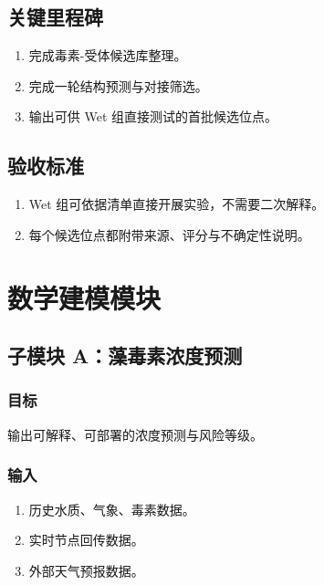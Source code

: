 \documentclass[12pt,a4paper,openany]{ctexrep}
\begin{document}
\section{关键里程碑}

\begin{enumerate}
\item 完成毒素-受体候选库整理。
\item 完成一轮结构预测与对接筛选。
\item 输出可供 Wet 组直接测试的首批候选位点。
\end{enumerate}

\section{验收标准}

\begin{enumerate}
\item Wet 组可依据清单直接开展实验，不需要二次解释。
\item 每个候选位点都附带来源、评分与不确定性说明。
\end{enumerate}

\chapter{数学建模模块}

\section{子模块 A：藻毒素浓度预测}

\subsection{目标}

输出可解释、可部署的浓度预测与风险等级。

\subsection{输入}

\begin{enumerate}
\item 历史水质、气象、毒素数据。
\item 实时节点回传数据。
\item 外部天气预报数据。
\end{enumerate}
\end{document}
